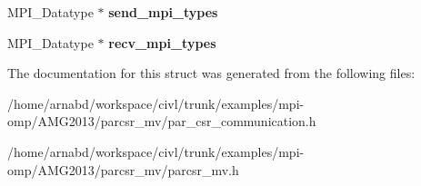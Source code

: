 \begin{DoxyCompactItemize}
\item 
\hypertarget{structhypre__ParCSRCommPkg_abb857451fe39e6c514e4f95af4aff7ab}{}M\+P\+I\+\_\+\+Datatype $\ast$ {\bfseries send\+\_\+mpi\+\_\+types}\label{structhypre__ParCSRCommPkg_abb857451fe39e6c514e4f95af4aff7ab}

\item 
\hypertarget{structhypre__ParCSRCommPkg_a475adb1b5d82cbaeff236528d6aa7888}{}M\+P\+I\+\_\+\+Datatype $\ast$ {\bfseries recv\+\_\+mpi\+\_\+types}\label{structhypre__ParCSRCommPkg_a475adb1b5d82cbaeff236528d6aa7888}

\end{DoxyCompactItemize}


The documentation for this struct was generated from the following files\+:\begin{DoxyCompactItemize}
\item 
/home/arnabd/workspace/civl/trunk/examples/mpi-\/omp/\+A\+M\+G2013/parcsr\+\_\+mv/par\+\_\+csr\+\_\+communication.\+h\item 
/home/arnabd/workspace/civl/trunk/examples/mpi-\/omp/\+A\+M\+G2013/parcsr\+\_\+mv/parcsr\+\_\+mv.\+h\end{DoxyCompactItemize}

